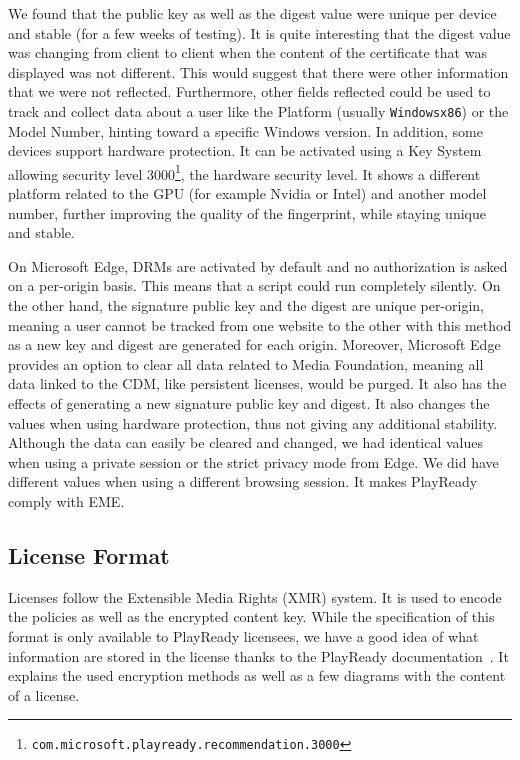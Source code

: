 \documentclass[11pt, a4paper]{IEEEtran}
\begin{document}
We found that the public key as well as the digest value were unique per device and stable (for a few weeks of testing). It is quite interesting that the digest value was changing from client to client when the content of the certificate that was displayed was not different. This would suggest that there were other information that we were not reflected. Furthermore, other fields reflected could be used to track and collect data about a user like the Platform (usually \texttt{Windowsx86}) or the Model Number, hinting toward a specific Windows version. In addition, some devices support hardware protection. It can be activated using a Key System allowing security level 3000\footnote{\texttt{com.microsoft.playready.recommendation.3000}}, the hardware security level. It shows a different platform related to the GPU (for example Nvidia or Intel) and another model number, further improving the quality of the fingerprint, while staying unique and stable.

On Microsoft Edge, DRMs are activated by default and no authorization is asked on a per-origin basis. This means that a script could run completely silently. On the other hand, the signature public key and the digest are unique per-origin, meaning a user cannot be tracked from one website to the other with this method as a new key and digest are generated for each origin. Moreover, Microsoft Edge provides an option to clear all data related to Media Foundation, meaning all data linked to the CDM, like persistent licenses, would be purged. It also has the effects of generating a new signature public key and digest. It also changes the values when using hardware protection, thus not giving any additional stability. Although the data can easily be cleared and changed, we had identical values when using a private session or the strict privacy mode from Edge. We did have different values when using a different browsing session. It makes PlayReady comply with EME.

\subsection{License Format}

Licenses follow the Extensible Media Rights (XMR) system. It is used to encode the policies  as well as the encrypted content key. While the specification of this format is only available to PlayReady licensees, we have a good idea of what information are stored in the license thanks to the PlayReady documentation~\cite{licenseacquisition,contentencryption}. It explains the used encryption methods as well as a few diagrams with the content of a license.
\end{document}
